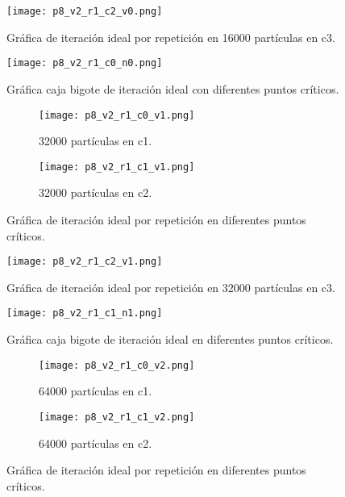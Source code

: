 \documentclass{article}
\begin{document}
\begin{figure}[H]
\centering
\texttt{[image: p8\_v2\_r1\_c2\_v0.png]}
\caption{\label{fig3}Gráfica de iteración ideal por repetición en 16000 partículas en c3.}
\end{figure}

\begin{figure}[H]
\centering
\texttt{[image: p8\_v2\_r1\_c0\_n0.png]}
\caption{\label{fig3} Gráfica caja bigote de iteración ideal con diferentes puntos críticos.}
\end{figure}

\begin{figure}[H]
\centering
\begin{subfigure}[b]{0.40\linewidth}
\texttt{[image: p8\_v2\_r1\_c0\_v1.png]}
\caption{32000 partículas en c1.}
\end{subfigure}
\begin{subfigure}[b]{0.40\linewidth}
\texttt{[image: p8\_v2\_r1\_c1\_v1.png]}
\caption{32000 partículas en c2.}
\end{subfigure}
\caption{Gráfica de iteración ideal por repetición en diferentes puntos críticos.}
\label{fig:westminster}
\end{figure}

\begin{figure}[H]
\centering
\texttt{[image: p8\_v2\_r1\_c2\_v1.png]}
\caption{\label{fig3} Gráfica de iteración ideal por repetición en 32000 partículas en c3.}
\end{figure}

\begin{figure}[H]
\centering
\texttt{[image: p8\_v2\_r1\_c1\_n1.png]}
\caption{\label{fig3} Gráfica caja bigote de iteración ideal en diferentes puntos críticos.}
\end{figure}

\begin{figure}[H]
\centering
\begin{subfigure}[b]{0.40\linewidth}
\texttt{[image: p8\_v2\_r1\_c0\_v2.png]}
\caption{64000 partículas en c1.}
\end{subfigure}
\begin{subfigure}[b]{0.40\linewidth}
\texttt{[image: p8\_v2\_r1\_c1\_v2.png]}
\caption{64000 partículas en c2.}
\end{subfigure}
\caption{Gráfica de iteración ideal por repetición en diferentes puntos críticos.}
\label{fig:westminster}
\end{figure}
\end{document}
